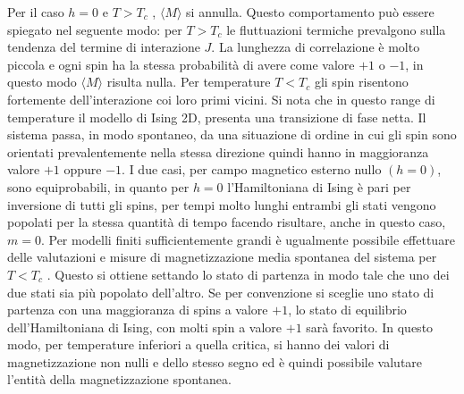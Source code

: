 \documentclass[a4paper,12pt]{article}
\begin{document}
Per il caso $h = 0$ e $T > T_c$ , $\langle M \rangle$ si annulla. Questo comportamento può essere spiegato nel seguente modo: per $T > T_c$ le fluttuazioni termiche prevalgono sulla tendenza del termine di interazione $J$. La lunghezza di correlazione è molto piccola e ogni spin ha la stessa probabilità di avere come valore $+1$ o $-1$, in questo modo $\langle M \rangle$ risulta nulla. Per temperature $T < T_c$ gli spin risentono fortemente dell’interazione coi loro primi vicini. Si nota che in questo range di temperature il modello di Ising 2D, presenta una transizione di fase netta. Il sistema passa, in modo spontaneo, da una situazione di ordine in cui gli spin sono orientati prevalentemente nella stessa direzione quindi hanno in maggioranza valore $+1$ oppure $-1$. I due casi, per campo magnetico esterno nullo $(h = 0)$, sono equiprobabili, in quanto per $h = 0$ l’Hamiltoniana di Ising è pari per inversione di tutti gli spins, per tempi molto lunghi entrambi gli stati vengono popolati per la stessa quantità di tempo facendo risultare, anche in questo caso, $m = 0$. Per modelli finiti sufficientemente grandi è ugualmente possibile effettuare delle valutazioni e misure di magnetizzazione media spontanea del sistema per $T < T_c$ . Questo si ottiene settando lo stato di partenza in modo tale che uno dei due stati sia più popolato dell’altro. Se per convenzione si sceglie uno stato di partenza con una maggioranza di spins a valore $+1$, lo stato di equilibrio dell’Hamiltoniana di Ising, con molti spin a valore $+1$ sarà favorito. In questo modo, per temperature inferiori a quella critica, si hanno dei valori di magnetizzazione non nulli e dello stesso segno ed è quindi possibile valutare l’entità della magnetizzazione spontanea.
\end{document}
